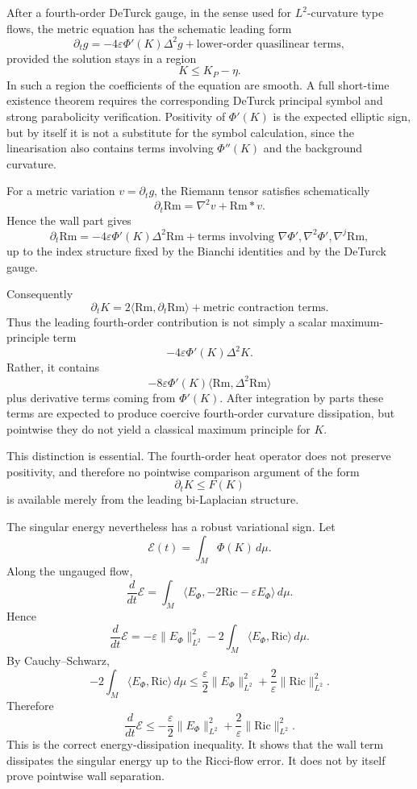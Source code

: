 \documentclass[11pt]{amsart}
\newcommand{\Rm}{\mathrm{Rm}}
\newcommand{\Ric}{\mathrm{Ric}}
\newcommand{\KP}{K_{\!P}}
\begin{document}
After a fourth-order DeTurck gauge, in the sense used for \(L^2\)-curvature
type flows, the metric equation has the schematic leading form
\[
\partial_t g
=
-4\varepsilon\Phi'(K)\Delta^2 g
+
\text{lower-order quasilinear terms},
\]
provided the solution stays in a region
\[
K\le \KP-\eta .
\]
In such a region the coefficients of the equation are smooth.  A full
short-time existence theorem requires the corresponding DeTurck principal
symbol and strong parabolicity verification.  Positivity of \(\Phi'(K)\) is
the expected elliptic sign, but by itself it is not a substitute for the symbol
calculation, since the linearisation also contains terms involving
\(\Phi''(K)\) and the background curvature.

For a metric variation \(v=\partial_tg\), the Riemann tensor satisfies
schematically
\[
\partial_t\Rm
=
\nabla^2v
+
\Rm*v .
\]
Hence the wall part gives
\[
\partial_t\Rm
=
-4\varepsilon\Phi'(K)\Delta^2\Rm
+
\text{terms involving }\nabla\Phi',\nabla^2\Phi',\nabla^j\Rm,
\]
up to the index structure fixed by the Bianchi identities and by the DeTurck
gauge.

Consequently
\[
\partial_tK
=
2\langle\Rm,\partial_t\Rm\rangle
+
\text{metric contraction terms}.
\]
Thus the leading fourth-order contribution is not simply a scalar
maximum-principle term
\[
-4\varepsilon\Phi'(K)\Delta^2K .
\]
Rather, it contains
\[
-8\varepsilon\Phi'(K)
\langle\Rm,\Delta^2\Rm\rangle
\]
plus derivative terms coming from \(\Phi'(K)\).  After integration by parts
these terms are expected to produce coercive fourth-order curvature
dissipation, but pointwise they do not yield a classical maximum principle for
\(K\).

This distinction is essential.  The fourth-order heat operator does not
preserve positivity, and therefore no pointwise comparison argument of the
form
\[
\partial_tK\le F(K)
\]
is available merely from the leading bi-Laplacian structure.

The singular energy nevertheless has a robust variational sign.  Let
\[
\mathcal E(t)=\int_M\Phi(K)\,d\mu .
\]
Along the ungauged flow,
\[
\frac d{dt}\mathcal E
=
\int_M
\langle E_\Phi,-2\Ric-\varepsilon E_\Phi\rangle
\,d\mu.
\]
Hence
\[
\frac d{dt}\mathcal E
=
-\varepsilon\|E_\Phi\|_{L^2}^2
-
2\int_M\langle E_\Phi,\Ric\rangle\,d\mu .
\]
By Cauchy--Schwarz,
\[
-2\int_M\langle E_\Phi,\Ric\rangle\,d\mu
\le
\frac{\varepsilon}{2}\|E_\Phi\|_{L^2}^2
+
\frac{2}{\varepsilon}\|\Ric\|_{L^2}^2 .
\]
Therefore
\[
\boxed{
\frac d{dt}\mathcal E
\le
-\frac{\varepsilon}{2}\|E_\Phi\|_{L^2}^2
+
\frac{2}{\varepsilon}\|\Ric\|_{L^2}^2 .
}
\]
This is the correct energy-dissipation inequality.  It shows that the wall
term dissipates the singular energy up to the Ricci-flow error.  It does not
by itself prove pointwise wall separation.
\end{document}
